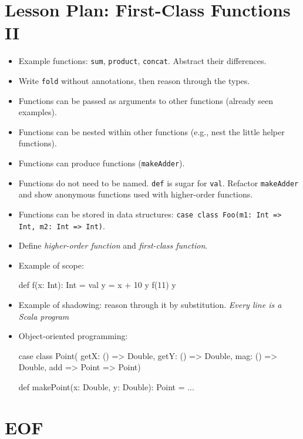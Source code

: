 \documentclass[9pt]{extbook}
\begin{document}
\chapter{Lesson Plan: First-Class Functions II}

\begin{itemize}

\item Example functions: \lstinline|sum|, \lstinline|product|, \lstinline|concat|. Abstract their differences. 

\item Write \lstinline|fold| without annotations, then reason through the types.

\item Functions can be passed as arguments to other functions (already seen examples).

\item Functions can be nested within other functions (e.g., nest the little helper functions).

\item Functions can produce functions (\lstinline|makeAdder|).

\item Functions do not need to be named. \lstinline|def| is sugar for
  \lstinline|val|. Refactor \lstinline|makeAdder| and show anonymous
  functions used with higher-order functions.

\item Functions can be stored in data structures:
  \lstinline|case class Foo(m1: Int => Int, m2: Int => Int)|.

\item Define \emph{higher-order function} and \emph{first-class function}.

\item Example of scope:

  \begin{scalacode}
  def f(x: Int): Int = {
    val y = x + 10
    y
  }
  f(11)
  y
  \end{scalacode}

\item Example of shadowing: reason through it by
  substitution. \emph{Every line is a Scala program}

\item Object-oriented programming:

\begin{scalacode}
case class Point(
  getX: () => Double,
  getY: () => Double,
  mag: () => Double,
  add => Point => Point)

def makePoint(x: Double, y: Double): Point = ...
\end{scalacode}

\end{itemize}

\chapter{EOF}
\end{document}

